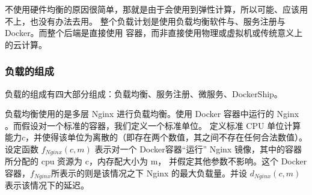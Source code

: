 不使用硬件均衡的原因很简单，那就是由于会使用到弹性计算，所以可能、应该用不上，也没有办法去用。
整个负载计划是使用负载均衡软件与、服务注册与Docker。而整个后端是直接使用 容器，而非直接使用物理或虚拟机或传统意义上的云计算。
\subsubsection{负载的组成}
负载的组成有四大部分组成：负载均衡、服务注册、微服务、DockerShip。

负载均衡使用的是多层 Nginx 进行负载均衡。使用 Docker 容器中运行的 Nginx 。而假设对一个标准的容器，我们定义一个标准单位。
定义标准 CPU 单位计算能力$c$，并使得该单位为离散的（即存在两个数值，其之间不存在任何合法数值）。设定函数
$f_{Nginx}(c,m)$ 表示对一个 Docker容器“运行” Nginx 镜像，其中的容器所分配的 cpu 资源为 c，内存配大小为 m，
并假定其他参数不影响。这个 Docker 容器，$f_{Nginx}$所表示的则是该情况之下 Nginx 的最大负载量。并设 $d_{Nginx}(c,m)$ 表示该情况下的延迟。



